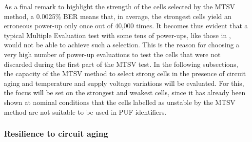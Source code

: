 As a final remark to highlight the strength of the cells selected by the MTSV method, a 0.0025\% BER means that, in average, the strongest cells yield an erroneous power-up only once out of 40,000 times. It becomes thus evident that a typical Multiple Evaluation test with some tens of power-ups, like those in \cite{Bhargava2012,Baturone2015}, would not be able to achieve such a selection. This is the reason for choosing a very high number of power-up evaluations to test the cells that were not discarded during the first part of the MTSV test.
In the following subsections, the capacity of the MTSV method to select strong cells in the presence of circuit aging and temperature and supply voltage variations will be evaluated. For this, the focus will be set on the strongest and weakest cells, since it has already been shown at nominal conditions that the cells labelled as unstable by the MTSV method are not suitable to be used in PUF identifiers.

\subsubsection{Resilience to circuit aging}
\label{ss:aging}

